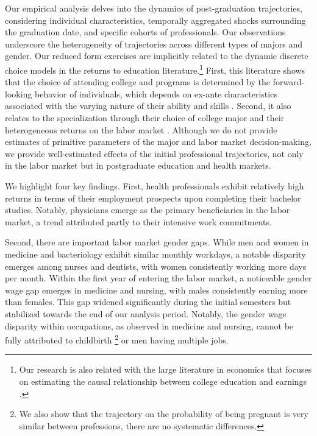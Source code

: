 \documentclass[12pt, a4paper]{article}
\begin{document}
Our empirical analysis delves into the dynamics of post-graduation trajectories, considering individual characteristics, temporally aggregated shocks surrounding the graduation date, and specific cohorts of professionals. Our observations underscore the heterogeneity of trajectories across different types of majors and gender. Our reduced form exercises are implicitly related to the dynamic discrete choice models in the returns to education literature.\footnote{Our research is also related with the large literature in economics that focuses on estimating the causal relationship between college education and earnings \citep{Patrinos2018}.} First, this literature shows that the choice of attending college and programs is determined by the forward-looking behavior of individuals, which depends on ex-ante characteristics associated with the varying nature of their ability and skills \citep{heckman2018returns,ge2013estimating}. Second, it also relates to the specialization through their choice of college major and their heterogeneous returns on the labor market \citep{Arcidiacono2020, Altonji2016}. Although we do not provide estimates of primitive parameters of the major and labor market decision-making, we provide well-estimated effects of the initial professional trajectories, not only in the labor market but in postgraduate education and health markets. 

We highlight four key findings. First, health professionals exhibit relatively high returns in terms of their employment prospects upon completing their bachelor studies. Notably, physicians emerge as the primary beneficiaries in the labor market, a trend attributed partly to their intensive work commitments. 

Second, there are important labor market gender gaps. While men and women in medicine and bacteriology exhibit similar monthly workdays, a notable disparity emerges among nurses and dentists, with women consistently working more days per month. Within the first year of entering the labor market, a noticeable gender wage gap emerges in medicine and nursing, with males consistently earning more than females. This gap widened significantly during the initial semesters but stabilized towards the end of our analysis period. Notably, the gender wage disparity within occupations, as observed in medicine and nursing, cannot be fully attributed to childbirth \citep{bertrand2010dynamics, goldin2014grand, goldin2011cost}\footnote{We also show that the trajectory on the probability of being pregnant is very similar between professions, there are no systematic differences.} or men having multiple jobs. 
\end{document}
